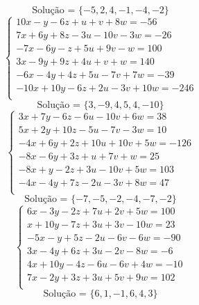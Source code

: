 \documentclass[12pt,oneside,a4paper]{article}
\begin{document}
\begin{equation*}
\text{Solução = }\{-5,2,4,-1,-4,-2\}
\end{equation*}
\vspace{\baselineskip}
\begin{equation*}
\begin{cases}
10x-y-6z+u+v+8w=-56 \\
7x+6y+8z-3u-10v-3w=-26 \\
-7x-6y-z+5u+9v-w=100 \\
3x-9y+9z+4u+v+w=140 \\
-6x-4y+4z+5u-7v+7w=-39 \\
-10x+10y-6z+2u-3v+10w=-246 \\
\end{cases}
\end{equation*}
\begin{equation*}
\text{Solução = }\{3,-9,4,5,4,-10\}
\end{equation*}
\vspace{\baselineskip}
\begin{equation*}
\begin{cases}
3x+7y-6z-6u-10v+6w=38 \\
5x+2y+10z-5u-7v-3w=10 \\
-4x+6y+2z+10u+10v+5w=-126 \\
-8x-6y+3z+u+7v+w=25 \\
-8x+y-2z+3u-10v+5w=103 \\
-4x-4y+7z-2u-3v+8w=47 \\
\end{cases}
\end{equation*}
\begin{equation*}
\text{Solução = }\{-7,-5,-2,-4,-7,-2\}
\end{equation*}
\vspace{\baselineskip}
\begin{equation*}
\begin{cases}
6x-3y-2z+7u+2v+5w=100 \\
x+10y-7z+3u+3v-10w=23 \\
-5x-y+5z-2u-6v-6w=-90 \\
3x-4y+6z+3u-2v-8w=-6 \\
4x+10y-4z-6u-6v+4w=-10 \\
7x-2y+3z+3u+5v+9w=102 \\
\end{cases}
\end{equation*}
\begin{equation*}
\text{Solução = }\{6,1,-1,6,4,3\}
\end{equation*}
\end{document}
